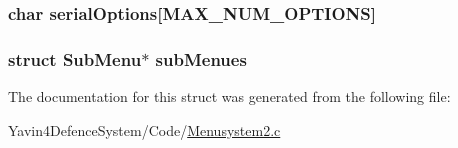 \hypertarget{structSubMenu_adcfcbb5b5340baf34c70fb8f4cc66f72}{
\subsubsection[{serial\+Options}]{\setlength{\rightskip}{0pt plus 5cm}char serial\+Options\mbox{[}{\bf M\+A\+X\+\_\+\+N\+U\+M\+\_\+\+O\+P\+T\+I\+O\+N\+S}\mbox{]}}}\label{structSubMenu_adcfcbb5b5340baf34c70fb8f4cc66f72}
\hypertarget{structSubMenu_a915aa121e09e4c3f914dc59727f390e3}{
\subsubsection[{sub\+Menues}]{\setlength{\rightskip}{0pt plus 5cm}struct {\bf Sub\+Menu}$\ast$ sub\+Menues}}\label{structSubMenu_a915aa121e09e4c3f914dc59727f390e3}


The documentation for this struct was generated from the following file\+:\begin{DoxyCompactItemize}
\item 
Yavin4\+Defence\+System/\+Code/\hyperlink{Menusystem2_8c}{Menusystem2.\+c}\end{DoxyCompactItemize}
